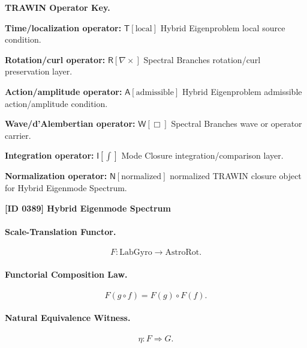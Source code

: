\par\vspace{0.45\baselineskip}
\noindent\begin{minipage}[t]{\linewidth}
\begingroup
\small
\raggedright
\textbf{TRAWIN Operator Key.}\par
\noindent\textbf{Time/localization operator:} $\mathsf{T}\!\left[\mathrm{local}\right]$ Hybrid Eigenproblem local source condition.\par
\noindent\textbf{Rotation/curl operator:} $\mathsf{R}\!\left[\nabla\times\right]$ Spectral Branches rotation/curl preservation layer.\par
\noindent\textbf{Action/amplitude operator:} $\mathsf{A}\!\left[\mathrm{admissible}\right]$ Hybrid Eigenproblem admissible action/amplitude condition.\par
\noindent\textbf{Wave/d'Alembertian operator:} $\mathsf{W}\!\left[\Box\right]$ Spectral Branches wave or operator carrier.\par
\noindent\textbf{Integration operator:} $\mathsf{I}\!\left[\int\right]$ Mode Closure integration/comparison layer.\par
\noindent\textbf{Normalization operator:} $\mathsf{N}\!\left[\mathrm{normalized}\right]$ normalized TRAWIN closure object for Hybrid Eigenmode Spectrum.\par
\endgroup
\end{minipage}

\clearpage
\noindent\textbf{[ID 0389] Hybrid Eigenmode Spectrum}\par
\vspace{0.35em}
\paragraph{Scale-Translation Functor.}
\begin{equation}
F:\mathrm{LabGyro}\longrightarrow\mathrm{AstroRot}.
\end{equation}

\paragraph{Functorial Composition Law.}
\begin{equation}
F(g\circ f)
=
F(g)\circ F(f).
\end{equation}

\paragraph{Natural Equivalence Witness.}
\begin{equation}
\eta:F\Rightarrow G .
\end{equation}

